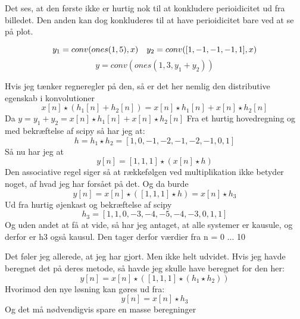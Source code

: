 \begin{Opgaver}
\begin{kapitel}
\begin{Opgave}
        Det ses, at den første ikke er hurtig nok til at konkludere perioidicitet ud fra billedet. 
        Den anden kan dog konkluderes til at have perioidicitet bare ved at se på plot. 
        \end{Opgave}

        \begin{Opgave}
            \[y_1 = conv(ones(1, 5), x)\tab{0} y_2 = conv([1, -1, -1, -1, 1], x)\]
            \[y = conv(ones(1, 3, y_1 + y_2))\]
            \begin{UnderOpgave}[Givet ovenstående find så det ækvivalente system hvor at $y=conv(h, x)$]
                Hvis jeg tænker regneregler på den, så er det her nemlig den distributive egenskab i konvolutioner
                \[x[n] \star (h_1[n] + h_2[n]) = x[n] \star h_1[n] + x[n] \star h_2[n]\]
                Da $y = y_1 + y_2 = x[n] \star h_1[n] + x[n] \star h_2[n]$
                Fra et hurtig hovedregning og med bekræftelse af scipy så har jeg at: 
                \[h = h_1 \star h_2 = [1, 0, -1, -2, -1, -2, -1, 0, 1]\]
                Så nu har jeg at
                \[y[n] = [1, 1, 1] \star (x[n] \star h)\]
                Den associative regel siger så at rækkefølgen ved multiplikation ikke betyder noget, af hvad jeg har forsået på det. 
                Og da burde
                \[y[n] = x[n] \star ([1, 1, 1] \star h) = x[n] \star h_3\]
                Ud fra hurtig øjenkast og bekræftelse af scipy
                \[h_3 = [1, 1, 0, -3, -4, -5, -4, -3, 0, 1, 1]\]
                Og uden andet at få at vide, så har jeg antaget, at alle systemer er kausule, og derfor er h3 også kausul. 
                Den tager derfor værdier fra n = 0 ... 10
            \end{UnderOpgave}
            \begin{UnderOpgave}
                Det føler jeg allerede, at jeg har gjort. Men ikke helt udvidet. 
                Hvis jeg havde beregnet det på deres metode, så havde jeg skulle have beregnet for den her: 
                \[y[n] = x[n] \star ([1, 1, 1] \star (h_1 \star h_2))\]
                Hvorimod den nye løsning kan gøres ud fra: 
                \[y[n] = x[n] \star h_3\]
                Og det må nødvendigvis spare en masse beregninger
            \end{UnderOpgave}

        \end{Opgave}


\end{kapitel}
\end{Opgaver}
